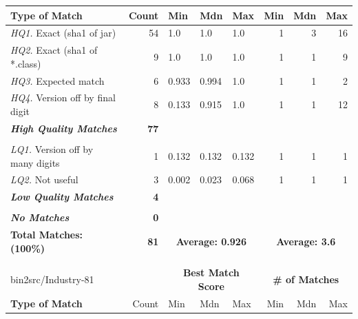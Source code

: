 \begin{table}[h]
\begin{tabular}[htbp]{l|r|lll|rrr}
        \textbf{Type of Match}     & Count        & Min   & Mdn    & Max   & Min  & Mdn  & Max  \\
        \hline
        \emph{HQ1.} Exact (sha1 of jar)        & 54           & 1.0   & 1.0    & 1.0   & 1    & 3    & 16   \\
        \emph{HQ2.} Exact (sha1 of *.class)    &  9           & 1.0   & 1.0    & 1.0   & 1    & 1    &  9   \\
        \emph{HQ3.} Expected match             &  6           & 0.933 & 0.994  & 1.0   & 1    & 1    &  2   \\
        \emph{HQ4.} Version off by final digit &  8           & 0.133 & 0.915  & 1.0   & 1    & 1    & 12   \\
        \emph{\textbf{High Quality Matches}}   & \textbf{77}  &       &        &       &      &      &      \\
        & & & & & & & \\
        \emph{LQ1.} Version off by many digits &  1           & 0.132 & 0.132  & 0.132 & 1    & 1    &  1   \\
        \emph{LQ2.} Not useful                 &  3           & 0.002 & 0.023  & 0.068 & 1    & 1    &  1   \\
        \emph{\textbf{Low Quality Matches}}    & \textbf{4}   &       &        &       &      &      &      \\
        & & & & & & & \\
        \emph{\textbf{No Matches}}             & \textbf{0}   &       &        &       &      &      &      \\
        \hline
        \textbf{Total Matches:} \hspace{2.5em} \textbf{(100\%)} & \textbf{81}  & \multicolumn{3}{c|}{\textbf{Average: 0.926}}  & \multicolumn{3}{c}{\textbf{Average: 3.6}} \\
        \multicolumn{8}{c}{} \\
        \multicolumn{8}{c}{} \\
        bin2src/Industry-81                    &              & \multicolumn{3}{c|}{\textbf{Best Match Score}}  & \multicolumn{3}{c}{\textbf{\# of Matches}} \\
        \textbf{Type of Match}                 & Count        & Min   & Mdn    & Max   & Min  & Mdn  & Max  \\
        \hline

\end{tabular}
\end{table}
